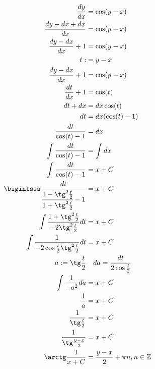 \begin{align*}
    \frac{dy}{dx}                                                           & =\cos(y-x)                             \\
    \frac{dy-dx+dx}{dx}                                                     & =\cos(y-x)                             \\
    \frac{dy-dx}{dx}+1                                                      & =\cos(y-x)                             \\
    t :                                                                     & = y-x                                  \\
    \frac{dy-dx}{dx}+1                                                      & =\cos(y-x)                             \\
    \frac{dt}{dx} + 1                                                       & = \cos(t)                              \\
    dt + dx                                                                 & = dx\cos(t)                            \\
    dt                                                                      & = dx(\cos(t) - 1)                      \\
    \frac{dt}{\cos(t) - 1}                                                  & = dx                                   \\
    \int\frac{dt}{\cos(t) - 1}                                              & = \int dx                              \\
    \int\frac{dt}{\cos(t) - 1}                                              & = x + C                                \\
    \bigintsss\frac{dt}{\cfrac{1-\tg^2\frac{t}{2}}{1+\tg^2\frac{t}{2}} - 1} & = x + C                                \\
    \int\frac{1+\tg^2\frac{t}{2}}{-2\tg^2\frac{t}{2}}dt                     & = x + C                                \\
    \int\frac{1}{-2\cos\frac{t}{2}\tg^2\frac{t}{2}}dt                       & = x + C                                \\
    a : = \tg\frac{t}{2}                                                    & \quad da = \frac{dt}{2\cos\frac{t}{2}} \\
    \int\frac{1}{-a^2}da                                                    & = x + C                                \\
    \frac{1}{a}                                                             & = x + C                                \\
    \frac{1}{\tg\frac{t}{2}}                                                & = x + C                                \\
    \frac{1}{\tg\frac{y-x}{2}}                                              & = x + C                                \\
    \arctg\frac{1}{x + C}                                                   & = \frac{y-x}{2} + \pi n, n\in\Z        \\
\end{align*}

